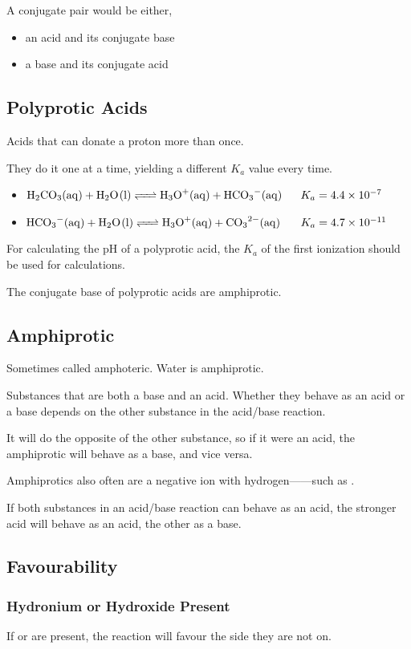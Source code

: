 \documentclass[a4paper,12pt]{article}
\begin{document}
A conjugate pair would be either,
\begin{itemize}
    \item{an acid and its conjugate base}
    \item{a base and its conjugate acid}
\end{itemize}

\subsection{Polyprotic Acids}
Acids that can donate a proton more than once.

They do it one at a time, yielding a different $K_a$ value every time.

\begin{itemize}
    \item{$\ce{H2CO3(aq) + H2O(l) <=> H3O+(aq) + HCO3-(aq)} \;\;\;\;\;\; K_a = \num{4.4e-7}$}
    \item{$\ce{HCO3-(aq) + H2O(l) <=> H3O+(aq) + CO3^{2-}(aq)} \,\;\;\;\;\;\; K_a = \num{4.7e-11}$}
\end{itemize}

For calculating the pH of a polyprotic acid, the $K_a$ of the first ionization should be used for calculations.

The conjugate base of polyprotic acids are amphiprotic.

\subsection{Amphiprotic}
Sometimes called amphoteric. Water is amphiprotic.

Substances that are both a base and an acid. Whether they behave as an acid or a base depends on the other substance in the acid/base reaction. 

It will do the opposite of the other substance, so if it were an acid, the amphiprotic will behave as a base, and vice versa.

Amphiprotics also often are a negative ion with hydrogen------such as .

If both substances in an acid/base reaction can behave as an acid, the stronger acid will behave as an acid, the other as a base.

\subsection{Favourability}
\subsubsection{Hydronium or Hydroxide Present}
If  or  are present, the reaction will favour the side they are not on.
\end{document}
